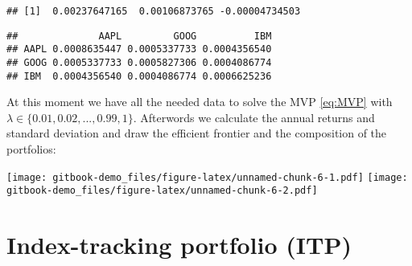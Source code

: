 \documentclass[
  oneside]{book}
\newenvironment{Shaded}{\begin{snugshade}}{\end{snugshade}}
\newcommand{\FunctionTok}[1]{\textcolor[rgb]{0.00,0.00,0.00}{#1}}
\newcommand{\NormalTok}[1]{#1}
\newcommand{\OtherTok}[1]{\textcolor[rgb]{0.56,0.35,0.01}{#1}}
\newcommand{\SpecialCharTok}[1]{\textcolor[rgb]{0.00,0.00,0.00}{#1}}
\begin{document}
\begin{verbatim}
## [1]  0.00237647165  0.00106873765 -0.00004734503
\end{verbatim}

\begin{Shaded}
\end{Shaded}

\begin{verbatim}
##              AAPL         GOOG          IBM
## AAPL 0.0008635447 0.0005337733 0.0004356540
## GOOG 0.0005337733 0.0005827306 0.0004086774
## IBM  0.0004356540 0.0004086774 0.0006625236
\end{verbatim}

At this moment we have all the needed data to solve the MVP \eqref{eq:MVP} with \(\lambda \in \{0.01, 0.02, ..., 0.99, 1\}\). Afterwords we calculate the annual returns and standard deviation and draw the efficient frontier and the composition of the portfolios:

\texttt{[image: gitbook-demo\_files/figure-latex/unnamed-chunk-6-1.pdf]} \texttt{[image: gitbook-demo\_files/figure-latex/unnamed-chunk-6-2.pdf]}

\hypertarget{index-tracking-portfolio-itp}{%
\section{Index-tracking portfolio (ITP)}\label{index-tracking-portfolio-itp}}
\end{document}
